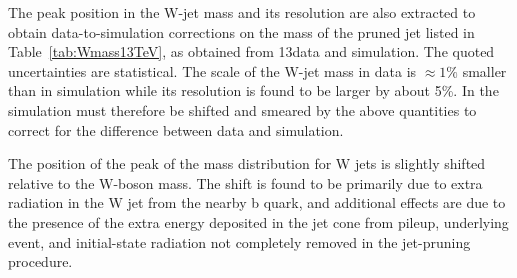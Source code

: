 The peak position in the W-jet mass and its resolution are also extracted to obtain data-to-simulation corrections on the mass of the pruned jet listed in Table~\ref{tab:Wmass13TeV}, as obtained from 13\TeV data and simulation. The quoted uncertainties are statistical. The scale of the W-jet mass in data is $\approx1\%$ smaller than in simulation while its resolution is found to be larger by about 5\%.
In the simulation \mJ must therefore be shifted and smeared by the above quantities to correct for the difference between data and simulation.

The position of the peak of the mass distribution for W jets is slightly shifted relative to the W-boson mass. The shift is found to be primarily due to extra radiation in the W jet from the nearby b quark, and additional effects are due to the presence of the extra energy deposited in the jet cone from pileup, underlying event, and initial-state radiation not completely removed in the jet-pruning procedure.\\

